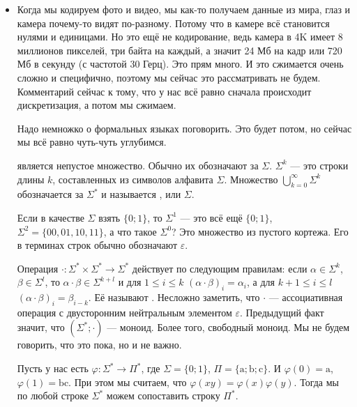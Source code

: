 \documentclass{article}
\begin{document}
    \begin{itemize}
        \item[]
        \begin{Comment}
            Когда мы кодируем фото и видео, мы как-то получаем данные из мира, глаз и камера почему-то видят по-разному. Потому что в камере всё становится нулями и единицами. Но это ещё не кодирование, ведь камера в 4K имеет 8 миллионов пикселей, три байта на каждый, а значит 24 Мб на кадр или 720 Мб в секунду (с частотой 30 Герц). Это прям много. И это сжимается очень сложно и специфично, поэтому мы сейчас это рассматривать не будем. Комментарий сейчас к тому, что у нас всё равно сначала происходит дискретизация, а потом мы сжимаем.
        \end{Comment}
        \begin{Comment}
            Надо немножко о формальных языках поговорить. Это будет потом, но сейчас мы всё равно чуть-чуть углубимся.
        \end{Comment}
        \dfn {} является непустое множество. Обычно их обозначают за $\Sigma$. $\Sigma^k$ --- это строки длины $k$, составленных из символов алфавита $\Sigma$. Множество $\bigcup_{k=0}^\infty \Sigma^k$ обозначается за $\Sigma^*$ и называется ,  или  $\Sigma$.
        \begin{Example}
            Если в качестве $\Sigma$ взять $\{0;1\}$, то $\Sigma^1$ --- это всё ещё $\{0;1\}$, $\Sigma^2=\{00,01,10,11\}$, а что такое $\Sigma^0$? Это множество из пустого кортежа. Его в терминах строк обычно обозначают $\varepsilon$.
        \end{Example}
        \dfn Операция $\cdot\colon\Sigma^*\times\Sigma^*\to\Sigma^*$ действует по следующим правилам: если $\alpha\in\Sigma^k$, $\beta\in\Sigma^l$, то $\alpha\cdot\beta\in\Sigma^{k+l}$ и для $1\leqslant i\leqslant k$ $(\alpha\cdot\beta)_i=\alpha_i$, а для $k+1\leqslant i\leqslant l$ $(\alpha\cdot\beta)_i=\beta_{i-k}$. Её называют .
        \thm Несложно заметить, что $\cdot$ --- ассоциативная операция с двусторонним нейтральным элементом $\varepsilon$.
        \thm Предыдущий факт значит, что $(\Sigma^*;\cdot)$ --- моноид. Более того, свободный моноид. Мы не будем говорить, что это пока, но и не важно.
        \begin{Example}
            Пусть у нас есть $\varphi\colon\Sigma^*\to\Pi^*$, где $\Sigma=\{0;1\}$, $\Pi=\{\mathrm a;\mathrm b;\mathrm c\}$. И $\varphi(0)=\mathrm a$, $\varphi(1)=\mathrm b\mathrm c$. При этом мы считаем, что $\varphi(xy)=\varphi(x)\varphi(y)$. Тогда мы по любой строке $\Sigma^*$ можем сопоставить строку $\Pi^*$.

\end{Example}
\end{itemize}
\end{document}
